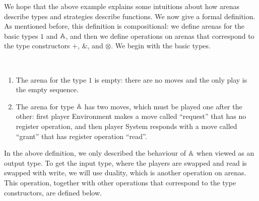 We hope that the above example explains some intuitions about how arenas describe types and strategies describe functions. We now give a formal definition. As mentioned before, this definition is compositional: we define arenas for the basic types $1$ and $\mathbb A$, and then we define operations on arenas that correspond to the type constructors  $+$, $\&$, and $\otimes$. We begin with the basic types.


\begin{definition}\label{def:arenas-without-atoms-or-functions} \ 
    \begin{enumerate}
        \item     The arena for the type $1$ is empty: there are no moves and the only play is the empty sequence. 
        \item The arena for type $\mathbb A$ has two moves, which must be played one after the other: first player Environment makes a move called ``request'' that has no register operation, and then player System responds with  a move called ``grant'' that has register operation ``read''.
    \end{enumerate}
\end{definition}

In the above definition, we only described the behaviour of $\mathbb A$ when viewed as an output type. To get the input type, where the players are swapped and read is swapped with write, we will use duality, which is another operation on arenas. This operation, together with other operations that correspond to the type constructors, are defined below.   

